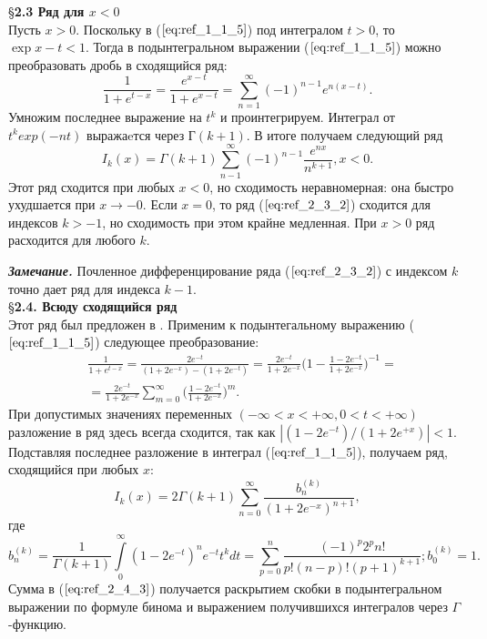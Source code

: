 \S \textbf{2.3 Ряд для $x < 0$}
\\

Пусть $x > 0$. Поскольку в ($\ref{eq:ref_1_1_5}$) под интегралом $t > 0$, то $\exp{x-t} < 1$. Тогда в
подынтегральном выражении ($\ref{eq:ref_1_1_5}$) можно преобразовать дробь в сходящийся
ряд:
\begin{equation}
\frac{1}{1+e^{t-x}} = \frac{e^{x-t}}{1+e^{x-t}}=\sum\limits_{n=1}^{\infty} (-1)^{n-1}e^{n(x-t)}.
\label{eq:ref_2_3_1}
\end{equation}
Умножим последнее выражение на $t^k$ и проинтегрируем. Интеграл от
$t^{k}exp(-nt)$ выражаeтся через $Г(k + 1)$. В итоге получаем следующий ряд \cite{Stoner}
\begin{equation}
I_k(x)=\Gamma(k+1)\sum\limits_{n-1}^{\infty} (-1)^{n-1}\frac{e^{nx}}{n^{k+1}},x<0.
\label{eq:ref_2_3_2}
\end{equation}
Этот ряд сходится при любых $x < 0$, но сходимость неравномерная: она быстро
ухудшается при $x \to -0$. Если $x = 0$, то ряд ($\ref{eq:ref_2_3_2}$) сходится для индексов $k > -1$, но
сходимость при этом крайне медленная. При $x > 0$ ряд расходится для любого
$k$.

\textbf{\textit{Замечание.}} Почленное дифференцирование ряда ($\ref{eq:ref_2_3_2}$) с индексом $k$ точно
дает ряд для индекса $k - 1$.
\\

\S \textbf{2.4. Всюду сходящийся ряд}
\\

Этот ряд был предложен в \cite{Kalitkin1968}. Применим к подынтегальному выражению
($\ref{eq:ref_1_1_5}$) следующее преобразование:
\begin{equation}
\begin{aligned}
&\frac{1}{1+e^{t-x}}=\frac{2e^{-t}}{(1+2e^{-x})-(1+2e^{-t})}=\frac{2e^{-t}}{1+2e^{-x}}\Bigg(1-\frac{1-2e^{-t}}{1+2e^{-x}}\Bigg)^{-1}=\\
&=\frac{2e^{-t}}{1+2e^{-x}} \sum_{m=0}^{\infty} \Bigg(\frac{1-2e^{-t}}{1+2e^{-x}}\Bigg)^{m}.
\end{aligned}
\label{eq:ref_2_4_1}
\end{equation}
При допустимых значениях переменных $(-\infty < x < +\infty,0 < t < +\infty)$ разложение в
ряд здесь всегда сходится, так как \linebreak $|(1-2e^{-t})/(1+2e^{+x})| < 1$. Подставляя
последнее разложение в интеграл ($\ref{eq:ref_1_1_5}$), получаем ряд, сходящийся при любых $x$:
\begin{equation}
I_k(x)=2\Gamma(k+1)\sum_{n=0}^{\infty} \frac{b_n^{(k)}}{(1+2e^{-x})^{n+1}},
\label{eq:ref_2_4_2}
\end{equation}
где
\begin{equation}
b_n^{(k)}=\frac{1}{\Gamma(k+1)}\int\limits_0^{\infty} (1-2e^{-t})^ne^{-t}t^kdt=\sum\limits_{p=0}^n \frac{(-1)^p 2^p n!}{p!(n-p)!(p+1)^{k+1}};b_0^{(k)}=1.
\label{eq:ref_2_4_3}
\end{equation}
Сумма в ($\ref{eq:ref_2_4_3}$) получается раскрытием скобки в подынтегральном выражении по
формуле бинома и выражением получившихся интегралов через $\Gamma$ -функцию.


